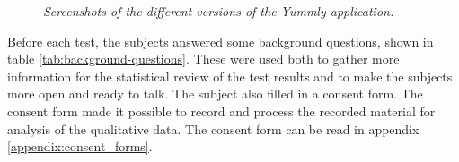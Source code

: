\begin{figure}[ht]
	\centering 
	\caption{\textit{Screenshots of the different versions of the Yummly application.}}
	\label{fig:yummly_screenshots}
\end{figure}


Before each test, the subjects answered some background questions, shown in table  \ref{tab:background-questions}. These were used both to gather more information for the statistical review of the test results and to make the subjects more open and ready to talk. The subject also filled in a consent form. The consent form made it possible to record and process the recorded material for analysis of the qualitative data. The consent form can be read in appendix \ref{appendix:consent_forms}.

